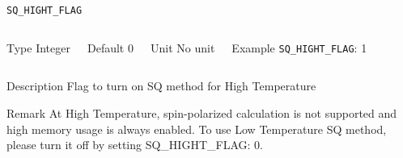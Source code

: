 \begin{frame}[allowframebreaks]{\texttt{SQ\_HIGHT\_FLAG}} \label{SQ_HIGHT_FLAG}
\vspace*{-12pt}
\begin{columns}
\begin{block}{Type}
Integer
\end{block}

\begin{block}{Default}
0
\end{block}

\begin{block}{Unit}
No unit
\end{block}

\begin{block}{Example}
\texttt{SQ\_HIGHT\_FLAG}: 1
\end{block}
\end{columns}

\begin{block}{Description}
Flag to turn on SQ method for High Temperature
\end{block}

\begin{block}{Remark}
At High Temperature, spin-polarized calculation is not supported and high memory usage is always enabled.
To use Low Temperature SQ method, please turn it off by setting SQ\_HIGHT\_FLAG: 0.
\end{block}

\end{frame}


